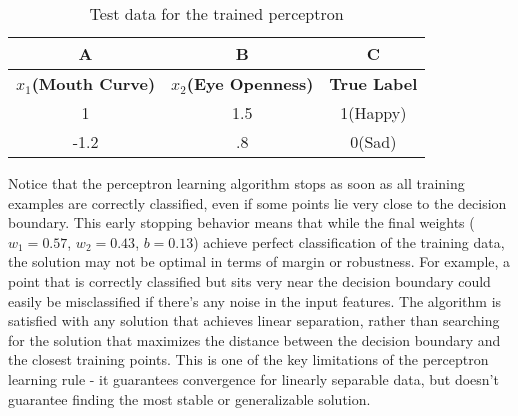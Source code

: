 \begin{figure}[h!]
\begin{tcolorbox}[every float=\centering, drop shadow, title=Decision Boundary After Training,colback=white,colframe=WMgreen,
  colbacktitle=WMgreen,]
  \label{fig:traindecisionbound}
 \end{tcolorbox}
\end{figure}

\begin{table}[h!]
\centering
\begin{tabular}{@{}|c|c|c|@{}}
\hline
\rowcolor{gray!30}\textbf{A} & \textbf{B} & \textbf{C}  \\ \hline
\textbf{$x_1$(Mouth Curve)} & \textbf{$x_2$(Eye Openness)} & \textbf{True Label} \\ \hline
1 & 1.5 & 1(Happy) \\ \hline
-1.2 & .8 & 0(Sad) \\ \hline
\end{tabular}
\caption{Test data for the trained perceptron}
\label{tab:perceptron_test}
\end{table}

Notice that the perceptron learning algorithm stops as soon as all training examples are correctly classified, even if some points lie very close to the decision boundary. This early stopping behavior means that while the final weights ($w_1 = 0.57$, $w_2 = 0.43$, $b = 0.13$) achieve perfect classification of the training data, the solution may not be optimal in terms of margin or robustness. For example, a point that is correctly classified but sits very near the decision boundary could easily be misclassified if there's any noise in the input features. The algorithm is satisfied with any solution that achieves linear separation, rather than searching for the solution that maximizes the distance between the decision boundary and the closest training points. This is one of the key limitations of the perceptron learning rule - it guarantees convergence for linearly separable data, but doesn't guarantee finding the most stable or generalizable solution.

